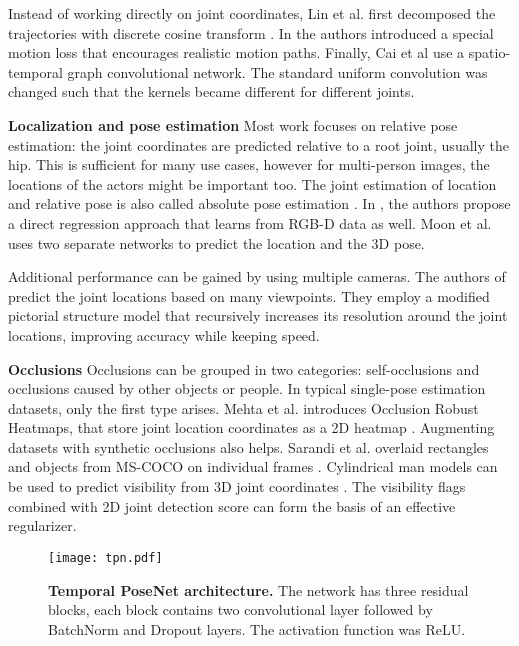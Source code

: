 \documentclass[runningheads, envcountsame, a4paper]{llncs}
\begin{document}
Instead of working directly on joint coordinates, Lin et al. first decomposed the trajectories with discrete cosine transform \cite{lin2019trajectory}.  
In \cite{wang2020motionloss} the authors introduced a special motion loss that encourages realistic motion paths. Finally, Cai et al \cite{cai2019stcnn} use a spatio-temporal graph convolutional network. The standard uniform convolution was changed such that the kernels became different for different joints. 

\textbf{Localization and pose estimation} Most work focuses on relative pose estimation: the joint coordinates are predicted relative to a root joint, usually the hip. This is sufficient for many use cases, however for multi-person images, the locations of the actors might be important too. The joint estimation of location and relative pose is also called absolute pose estimation \cite{veges2019depthpose}. In \cite{veges2020wdspose}, the authors propose a direct regression approach that learns from RGB-D data as well. 
Moon et al. \cite{moon2019camdistance} uses two separate networks to predict the location and the 3D pose.

Additional performance can be gained by using multiple cameras. The authors of \cite{qiu2019crossview} predict the joint locations based on many viewpoints. They employ a modified pictorial structure model that recursively increases its resolution around the joint locations, improving accuracy while keeping speed. 

\textbf{Occlusions} Occlusions can be grouped in two categories: self-occlusions and occlusions caused by other objects or people. In typical single-pose estimation datasets, only the first type arises. Mehta et al. introduces Occlusion Robust Heatmaps, that store joint location coordinates as a 2D heatmap \cite{mehta2018single_shot}. Augmenting datasets with synthetic occlusions also helps. Sarandi et al. overlaid rectangles and objects from MS-COCO on individual frames \cite{sarandi2018eccv_winner}. Cylindrical man models can be used to predict visibility from 3D joint coordinates \cite{cheng2019occlusionaware}. The visibility flags combined with 2D joint detection score can form the basis of an effective regularizer.

\begin{figure*}[t]
\centering
\texttt{[image: tpn.pdf]}
\caption{\textbf{Temporal PoseNet architecture.} The network has three residual blocks, each block contains two convolutional layer followed by BatchNorm and Dropout layers. The activation function was ReLU.}
\label{fig:tpn}
\end{figure*}
\end{document}
